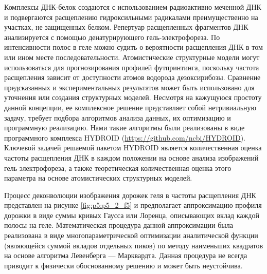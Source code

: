  Комплексы ДНК-белок создаются с использованием радиоактивно меченной ДНК и подвергаются расщеплению гидроксильными радикалами преимущественно на участках, не защищенных белком. Репертуар расщепленных фрагментов ДНК анализируется с помощью денатурирующего гель-электрофореза. По интенсивности полос в геле можно судить о вероятности расщепления ДНК в том или ином месте последовательности. Атомистические структурные модели могут использоваться для прогнозирования профилей футпринтинга, поскольку частота расщепления зависит от доступности атомов водорода дезоксирибозы. Сравнение предсказанных и экспериментальных результатов может быть использовано для уточнения или создания структурных моделей. Несмотря на кажущуюся простоту данной концепции, ее комплексное решение представляет собой нетривиальную задачу, требует подбора алгоритмов анализа данных, их оптимизацию и программную реализацию. Нами такие алгоритмы были реализованы в виде программного комплекса HYDROID \cite{shaytan_structural_2018} (\url{https://github.com/ncbi/HYDROID}). Ключевой задачей решаемой пакетом HYDROID является количественная оценка частоты расщепления ДНК в каждом положении на основе анализа изображений гель электрофореза, а также теоретическая количественная оценка этого параметра на основе атомистических структурных моделей.
 
Процесс деконволюции изображения дорожек геля в частоты расщепления ДНК представлен на рисунке \ref{fig:p5:p5_2_f5} и предполагает аппроксимацию профиля дорожки в виде суммы кривых Гаусса или Лоренца, описывающих вклад каждой полосы на геле. Математическая процедура данной аппроксимации была реализована в виде многопараметрической оптимизации аналитической функции (являющейся суммой вкладов отдельных пиков) по методу наименьших квадратов на основе алгоритма Левенберга — Марквардта. Данная процедура не всегда приводит к физически обоснованному решению и может быть неустойчива.





